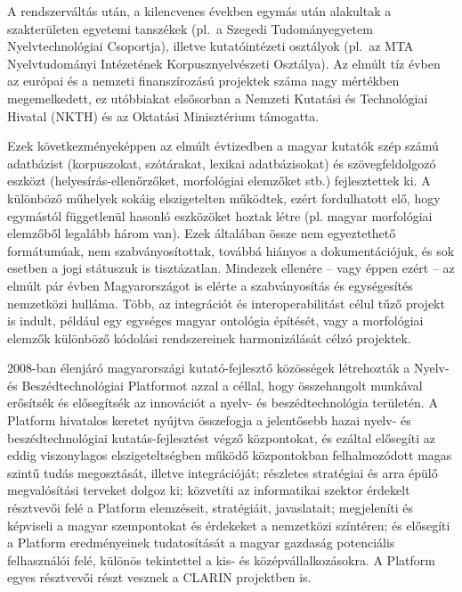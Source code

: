 \begin{multicols}{2}
  A rendszerváltás után, a kilencvenes években egymás után alakultak a szakterületen egyetemi tanszékek (pl.\ a Szegedi Tudományegyetem Nyelvtechnológiai Csoportja), illetve kutatóintézeti osztályok (pl.\ az MTA Nyelvtudományi Intézetének Korpusznyelvészeti Osztálya). Az elmúlt tíz évben az európai és a nemzeti finanszírozású projektek száma nagy mértékben megemelkedett, ez utóbbiakat elsősorban a Nemzeti Kutatási és Technológiai Hivatal (NKTH) és az Oktatási Mi\-nisz\-té\-ri\-um támogatta.

  Ezek következményeképpen az elmúlt évtizedben a magyar kutatók szép számú adatbázist (korpuszokat, szótárakat, lexi\-kai adatbázisokat) és szövegfeldolgozó esz\-közt (helyesírás-ellenőrzőket, morfológiai elemzőket stb.) fejlesztettek ki. A különböző műhelyek sokáig elszigetelten működtek, ezért fordulhatott elő, hogy egymástól függetlenül hasonló eszközöket hoztak létre (pl. magyar morfológiai elem\-ző\-ből legalább három van). Ezek általában össze nem egyeztethető formátumúak, nem szabványosítottak, továbbá hiányos a dokumentációjuk, és sok eset\-ben a jogi státuszuk is tisztázatlan. Mindezek ellenére -- vagy éppen ezért -- az elmúlt pár évben Magyarországot is elérte a szab\-vá\-nyo\-sí\-tás és egységesítés nemzetközi hulláma. Több, az integrációt és interoperabilitást célul tűző projekt is indult, például egy egységes magyar ontológia építését, vagy a morfológiai elemzők különböző kódolási rendszereinek harmonizálását célzó projektek. 

  2008-ban élenjáró magyarországi kutató-fejlesztő közösségek létrehozták a Nyelv- és Beszédtechnológiai Platformot \cite{platform} azzal a céllal, hogy összehangolt munkával erősítsék és elősegítsék az innovációt a nyelv- és beszédtechnológia területén. A Platform hivatalos keretet nyújtva összefogja a jelentősebb hazai nyelv- és beszédtechnológiai kutatás-fejlesztést vég\-ző központokat, és ezáltal elősegíti az eddig viszonylagos elszigeteltségben működő központokban felhalmozódott magas szin\-tű tudás megosztását, illetve integrációját; részletes stratégiai és arra épülő megvalósítási terveket dolgoz ki; közvetíti az informatikai szektor érdekelt résztvevői felé a Platform elemzéseit, stratégiáit, javaslatait; megjeleníti és képviseli a ma\-gyar szempontokat és érdekeket a nem\-zet\-kö\-zi színtéren; és elősegíti a Platform eredményeinek tudatosítását a magyar gazdaság potenciális felhasználói felé, különös tekintettel a kis- és középvállalkozásokra. A Platform egyes résztvevői részt vesznek a CLARIN projektben is.  


\end{multicols}
